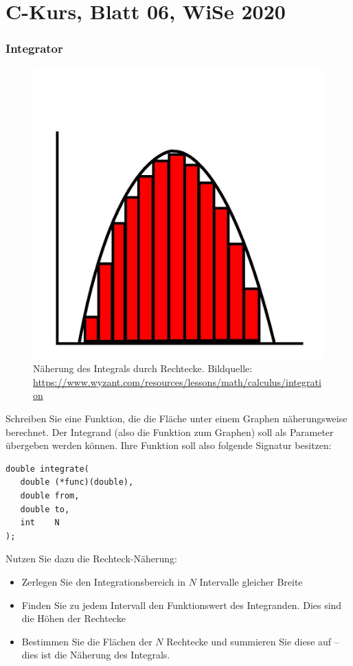 \documentclass[
	ngerman,
	fontsize=10pt,
	parskip=half,
	titlepage=true,
	DIV=12
]{scrartcl}
\begin{document}
\part*{C-Kurs, Blatt 06, WiSe 2020}

\section{Integrator}
\begin{figure}
	\vspace{-50pt}
	\includegraphics[width=\linewidth]{./integral}
	\caption{Näherung des Integrals durch Rechtecke.\newline
		Bildquelle: \url{https://www.wyzant.com/resources/lessons/math/calculus/integration}}
	\vspace{-50pt}
\end{figure}
Schreiben Sie eine Funktion, die die Fläche unter einem Graphen näherungsweise berechnet. Der Integrand (also die Funktion zum Graphen) soll als Parameter übergeben werden können. Ihre Funktion soll also folgende Signatur besitzen:
\begin{verbatim}
double integrate(
   double (*func)(double), 
   double from, 
   double to, 
   int    N
);
\end{verbatim}

Nutzen Sie dazu die Rechteck-Näherung:
\begin{itemize}
\item Zerlegen Sie den Integrationsbereich in $N$ Intervalle gleicher Breite
\item Finden Sie zu jedem Intervall den Funktionswert des Integranden. Dies sind die Höhen der Rechtecke
\item Bestimmen Sie die Flächen der $N$ Rechtecke und summieren Sie diese auf -- dies ist die Näherung des Integrals.
\end{itemize}
\end{document}
